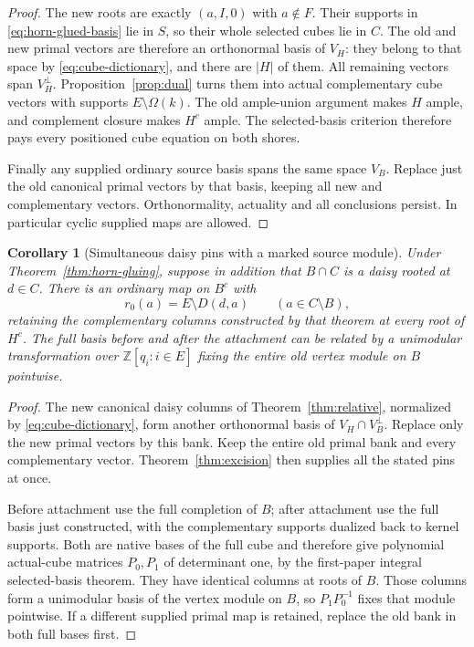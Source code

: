 \documentclass[11pt]{article}
\newtheorem{corollary}[theorem]{Corollary}
\theoremstyle{definition}
\begin{document}
\begin{proof}
The new roots are exactly $(a,I,0)$ with $a\notin F$.
Their supports in \eqref{eq:horn-glued-basis} lie in $S$, so their
whole selected cubes lie in $C$. The old and new primal vectors are
therefore an orthonormal basis of $V_H$: they belong to that space
by \eqref{eq:cube-dictionary}, and there are $|H|$ of them.
All remaining vectors span $V_H^\perp$. Proposition~\ref{prop:dual}
turns them into actual complementary cube vectors with supports
$E\setminus\Omega(k)$. The old ample-union argument makes $H$ ample,
and complement closure makes $H^c$ ample. The selected-basis criterion
therefore pays every positioned cube equation on both shores.

Finally any supplied ordinary source basis spans the same space $V_B$.
Replace just the old canonical primal vectors by that basis, keeping
all new and complementary vectors. Orthonormality, actuality and all
conclusions persist. In particular cyclic supplied maps are allowed.
\end{proof}

\begin{corollary}[Simultaneous daisy pins with a marked source module]
\label{cor:horn-gluing-pins}
Under Theorem~\ref{thm:horn-gluing}, suppose in addition that $B\cap C$
is a daisy rooted at $d\in C$. There is an ordinary map on $B^c$ with
\[
 r_0(a)=E\setminus D(d,a)\qquad(a\in C\setminus B),
\]
retaining the complementary columns constructed by that theorem at every
root of $H^c$. The full basis before and after the attachment can be
related by a unimodular transformation over $\mathbb Z[q_i:i\in E]$
fixing the entire old vertex module on $B$ pointwise.
\end{corollary}
\begin{proof}
The new canonical daisy columns of Theorem~\ref{thm:relative}, normalized
by \eqref{eq:cube-dictionary}, form another orthonormal basis of
$V_H\cap V_B^\perp$. Replace only the new primal vectors by this bank.
Keep the entire old primal bank and every complementary vector.
Theorem~\ref{thm:excision} then supplies all the stated pins at once.

Before attachment use the full completion of $B$; after attachment use
the full basis just constructed, with the complementary supports
dualized back to kernel supports. Both are native bases of the full
cube and therefore give polynomial actual-cube matrices $P_0,P_1$
of determinant one, by the first-paper integral selected-basis theorem.
They have identical columns at roots of $B$. Those columns form a
unimodular basis of the vertex module on $B$, so
$P_1P_0^{-1}$ fixes that module pointwise. If a different supplied primal
map is retained, replace the old bank in both full bases first.
\end{proof}
\end{document}
